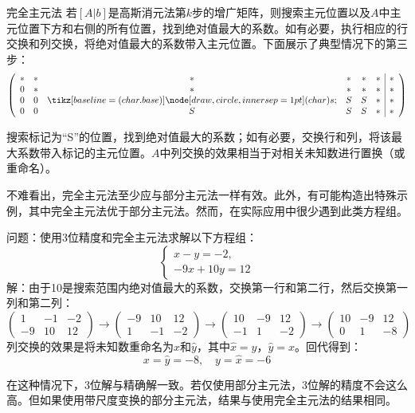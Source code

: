 \begin{bluebox}{完全主元法}
若$[A|b]$是高斯消元法第$k$步的增广矩阵，则搜索主元位置以及$A$中主元位置下方和右侧的所有位置，找到绝对值最大的系数。如有必要，执行相应的行交换和列交换，将绝对值最大的系数带入主元位置。下面展示了典型情况下的第三步：
$$
\left(\begin{array}{cccccc|c} 
* & * & * & * & * & * & * \\
0 & * & * & * & * & * & * \\
0 & 0 & \circlednum{s} & S & S & * & * \\
0 & 0 & S & S & S & * & *
\end{array}\right)
$$

搜索标记为“S”的位置，找到绝对值最大的系数；如有必要，交换行和列，将该最大系数带入标记的主元位置。$A$中列交换的效果相当于对相关未知数进行置换（或重命名）。
\end{bluebox}

不难看出，完全主元法至少应与部分主元法一样有效。此外，有可能构造出特殊示例，其中完全主元法优于部分主元法。然而，在实际应用中很少遇到此类方程组。

\begin{example}
\label{example1.5.3}
问题：使用3位精度和完全主元法求解以下方程组：
$$
\begin{cases} 
    x - y = -2, \\
-9x + 10y = 12
\end{cases}
$$
解：由于10是搜索范围内绝对值最大的系数，交换第一行和第二行，然后交换第一列和第二列：
$$
\left(\begin{array}{cc|c} 
1 & -1 & -2 \\
-9 & 10 & 12 
\end{array}\right) \xrightarrow{} \left(\begin{array}{cc|c} 
-9 & 10 & 12 \\
1 & -1 & -2 
\end{array}\right) \xrightarrow{} \left(\begin{array}{cc|c} 
10 & -9 & 12 \\
-1 & 1 & -2 
\end{array}\right) \xrightarrow{} \left(\begin{array}{cc|c}
10 & -9 & 12 \\
0 & 1 & -8    
\end{array}\right)
$$
列交换的效果是将未知数重命名为$\hat{x}$和$\hat{y}$，其中$\hat{x}=y$，$\hat{y}=x$。回代得到：
$$x=\hat{y}=-8, \quad y=\hat{x}=-6$$

在这种情况下，3位解与精确解一致。若仅使用部分主元法，3位解的精度不会这么高。但如果使用带尺度变换的部分主元法，结果与使用完全主元法的结果相同。
\end{example}

